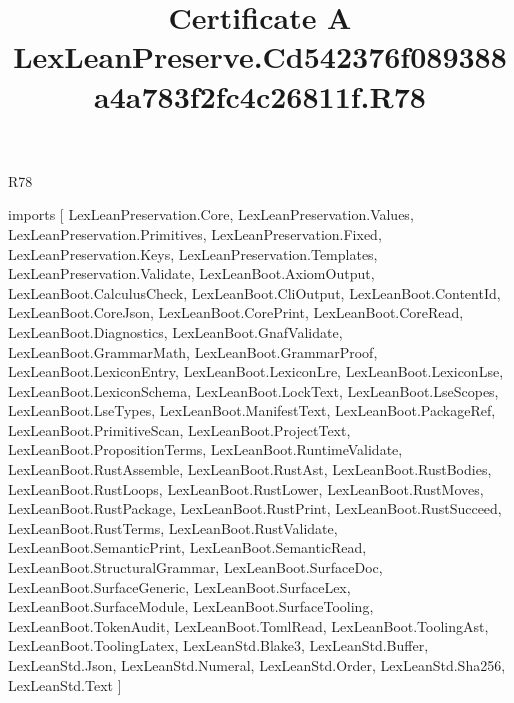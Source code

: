 \begin{lexlean}{R78}
\title{Certificate A LexLeanPreserve.Cd542376f089388a4a783f2fc4c26811f.R78}
\begin{coremodule}
imports [
  LexLeanPreservation.Core,
  LexLeanPreservation.Values,
  LexLeanPreservation.Primitives,
  LexLeanPreservation.Fixed,
  LexLeanPreservation.Keys,
  LexLeanPreservation.Templates,
  LexLeanPreservation.Validate,
  LexLeanBoot.AxiomOutput,
  LexLeanBoot.CalculusCheck,
  LexLeanBoot.CliOutput,
  LexLeanBoot.ContentId,
  LexLeanBoot.CoreJson,
  LexLeanBoot.CorePrint,
  LexLeanBoot.CoreRead,
  LexLeanBoot.Diagnostics,
  LexLeanBoot.GnafValidate,
  LexLeanBoot.GrammarMath,
  LexLeanBoot.GrammarProof,
  LexLeanBoot.LexiconEntry,
  LexLeanBoot.LexiconLre,
  LexLeanBoot.LexiconLse,
  LexLeanBoot.LexiconSchema,
  LexLeanBoot.LockText,
  LexLeanBoot.LseScopes,
  LexLeanBoot.LseTypes,
  LexLeanBoot.ManifestText,
  LexLeanBoot.PackageRef,
  LexLeanBoot.PrimitiveScan,
  LexLeanBoot.ProjectText,
  LexLeanBoot.PropositionTerms,
  LexLeanBoot.RuntimeValidate,
  LexLeanBoot.RustAssemble,
  LexLeanBoot.RustAst,
  LexLeanBoot.RustBodies,
  LexLeanBoot.RustLoops,
  LexLeanBoot.RustLower,
  LexLeanBoot.RustMoves,
  LexLeanBoot.RustPackage,
  LexLeanBoot.RustPrint,
  LexLeanBoot.RustSucceed,
  LexLeanBoot.RustTerms,
  LexLeanBoot.RustValidate,
  LexLeanBoot.SemanticPrint,
  LexLeanBoot.SemanticRead,
  LexLeanBoot.StructuralGrammar,
  LexLeanBoot.SurfaceDoc,
  LexLeanBoot.SurfaceGeneric,
  LexLeanBoot.SurfaceLex,
  LexLeanBoot.SurfaceModule,
  LexLeanBoot.SurfaceTooling,
  LexLeanBoot.TokenAudit,
  LexLeanBoot.TomlRead,
  LexLeanBoot.ToolingAst,
  LexLeanBoot.ToolingLatex,
  LexLeanStd.Blake3,
  LexLeanStd.Buffer,
  LexLeanStd.Json,
  LexLeanStd.Numeral,
  LexLeanStd.Order,
  LexLeanStd.Sha256,
  LexLeanStd.Text
]


\end{coremodule}
\end{lexlean}
